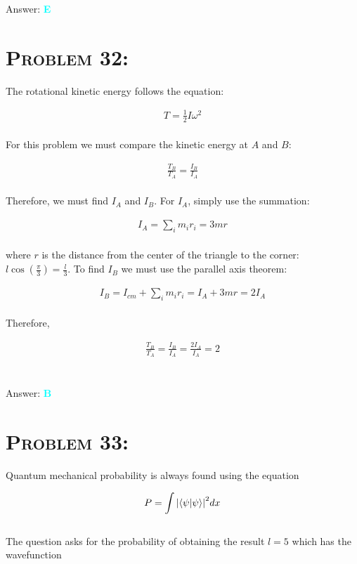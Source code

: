 \documentclass{article}
\begin{document}
Answer: \textbf{\textcolor{cyan}E}\\


\section{\textsc{Problem 32:}} The rotational kinetic energy follows the equation:

\begin{gather}
T = \frac{1}{2} I \omega^{2}
\end{gather}
\\
For this problem we must  compare the kinetic energy at $A$ and $B$:

\begin{gather}
\frac{T_{B}}{T_{A}} = \frac{I_{B}}{I_{A}}
\end{gather}
\\
Therefore, we must find $I_{A}$ and $I_{B}$. For $I_{A}$, simply use the summation: 

\begin{gather}
I_{A} = \sum_{i}{m_{i}r_{i}} = 3mr\nonumber
\end{gather}
\\
where $r$ is the distance from the center of the triangle to the corner: $l \cos{\left(  \frac{\pi}{3}  \right)} = \frac{l}{3}$. To find $I_{B}$ we must use the parallel axis theorem:

\begin{gather}
I_{B} = I_{cm} +  \sum_{i}{m_{i}r_{i}} = I_{A} + 3mr = 2I_{A} \nonumber
\end{gather}
\\
Therefore, 

\begin{gather}
\frac{T_{B}}{T_{A}} = \frac{I_{B}}{I_{A}} =  \frac{2I_{A} }{I_{A}} = \boxed{2}\nonumber
\end{gather}
\\\\
Answer: \textbf{\textcolor{cyan}B}\\


\section{\textsc{Problem 33:}} Quantum mechanical probability is always found using the equation

\begin{gather}
P = \int{\left| \braket{\psi | \psi} \right|}^{2} dx
\end{gather}
\\
The question asks for the probability of obtaining the result $l = 5$ which has the wavefunction
\end{document}
